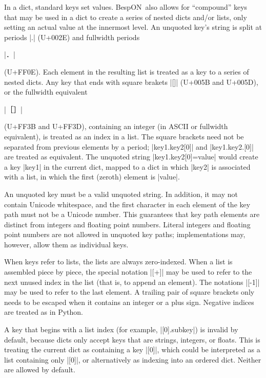 \documentclass[11pt]{article}
\newcommand{\bespon}{BespON}
\begin{document}
In a dict, standard keys set values.  \bespon\ also allows for ``compound'' keys that may be used in a dict to create a series of nested dicts and/or lists, only setting an actual value at the innermost level.  An unquoted key's string is split at periods |.| (U+002E) and fullwidth periods \begin{CJK*}{UTF8}{gkai}|．|\end{CJK*} (U+FF0E).  Each element in the resulting list is treated as a key to a series of nested dicts.  Any key that ends with square brakets |[]| (U+005B and U+005D), or the fullwidth equivalent \begin{CJK*}{UTF8}{gkai}|［］|\end{CJK*} (U+FF3B and U+FF3D), containing an integer (in ASCII or fullwidth equivalent), is treated as an index in a list.  The square brackets need not be separated from previous elements by a period; |key1.key2[0]| and |key1.key2.[0]| are treated as equivalent.  The unquoted string |key1.key2[0]=value| would create a key |key1| in the current dict, mapped to a dict in which |key2| is associated with a list, in which the first (zeroth) element is |value|.

An unquoted key must be a valid unquoted string.  In addition, it may not contain Unicode whitespace, and the first character in each element of the key path must not be a Unicode number.  This guarantees that key path elements are distinct from integers and floating point numbers.  Literal integers and floating point numbers are not allowed in unquoted key paths; implementations may, however, allow them as individual keys.

When keys refer to lists, the lists are always zero-indexed.  When a list is assembled piece by piece, the special notation |[+]| may be used to refer to the next unused index in the list (that is, to append an element).  The notations |[-1]| may be used to refer to the last element.  A trailing pair of square brackets only needs to be escaped when it contains an integer or a plus sign.  Negative indices are treated as in Python.

A key that begins with a list index (for example, |[0].subkey|) is invalid by default, because dicts only accept keys that are strings, integers, or floats.  This is treating the current dict as containing a key |[0]|, which could be interpreted as a list containing only |[0]|, or alternatively as indexing into an ordered dict.  Neither are allowed by default.
\end{document}
